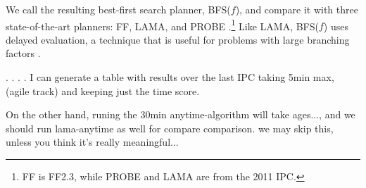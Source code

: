 
We call the resulting best-first search planner, BFS($f$), and compare
it with three state-of-the-art planners: FF, LAMA, and PROBE
\cite{hoffmann:ff,richter:lama,nir:icaps11}.\footnote{FF is FF2.3,
  while PROBE and LAMA are from the 2011 IPC.}  Like LAMA, BFS($f$)
uses delayed evaluation, a technique that is useful for problems with
large branching factors \cite{richter:preferred-ops-and-deferred}.

.  .  .  .  I can generate a table with results over the last IPC
taking 5min max, (agile track) and keeping just the time score.

On the other hand, runing the 30min anytime-algorithm will take ages..., and
we should run lama-anytime as well for compare comparison. we may skip this,
unless you think it's really meaningful...
